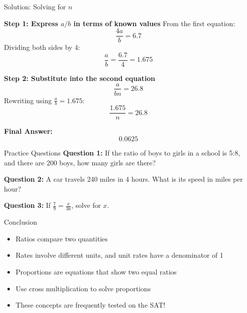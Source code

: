 \documentclass{beamer}
\begin{document}
\begin{frame}{Solution: Solving for \( n \)}

\textbf{Step 1: Express \( a/b \) in terms of known values}
From the first equation:
\[
\frac{4a}{b} = 6.7
\]
Dividing both sides by 4:
\[
\frac{a}{b} = \frac{6.7}{4} = 1.675
\]

\textbf{Step 2: Substitute into the second equation}
\[
\frac{a}{bn} = 26.8
\]
Rewriting using \( \frac{a}{b} = 1.675 \):
\[
\frac{1.675}{n} = 26.8
\]



\textbf{Final Answer:}
\[
\boxed{0.0625}
\]

\end{frame}





\begin{frame}{Practice Questions}
    \textbf{Question 1:} If the ratio of boys to girls in a school is 5:8, and there are 200 boys, how many girls are there?

    \textbf{Question 2:} A car travels 240 miles in 4 hours. What is its speed in miles per hour?

    \textbf{Question 3:} If \( \frac{7}{9} = \frac{x}{36} \), solve for \( x \).
\end{frame}

\begin{frame}{Conclusion}
    \begin{itemize}
        \item Ratios compare two quantities
        \item Rates involve different units, and unit rates have a denominator of 1
        \item Proportions are equations that show two equal ratios
        \item Use cross multiplication to solve proportions
        \item These concepts are frequently tested on the SAT!
    \end{itemize}
\end{frame}
\end{document}
